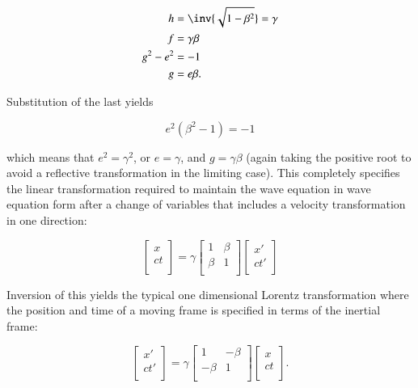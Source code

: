 \begin{align}
h &= \inv{\sqrt{1 - \beta^2}} = \gamma \\
f &= \gamma \beta \\
g^2 - e^2 &= -1 \\
g &= e \beta.
\end{align}

Substitution of the last yields

\[
e^2 (\beta^2 - 1) = -1
\]

which means that $e^2 = \gamma^2$, or $e = \gamma$, and $g = \gamma \beta$ (again taking the positive root to avoid a reflective transformation in the limiting case).  This completely specifies the linear
transformation required to maintain the wave equation in wave equation form after a change of variables that includes
a velocity transformation in one direction:

\begin{equation}
\begin{bmatrix}
x \\
ct \\
\end{bmatrix}
=
\gamma
\begin{bmatrix}
1 & \beta \\
\beta & 1 \\
\end{bmatrix}
\begin{bmatrix}
x' \\
c t' \\
\end{bmatrix}
\end{equation}

Inversion of this yields the typical one dimensional Lorentz transformation where the position and time of a moving
frame is specified in terms of the inertial frame:

\begin{equation}
\begin{bmatrix}
x' \\
ct' \\
\end{bmatrix}
=
\gamma
\begin{bmatrix}
1 & -\beta \\
-\beta & 1 \\
\end{bmatrix}
\begin{bmatrix}
x \\
c t \\
\end{bmatrix}.
\end{equation}


